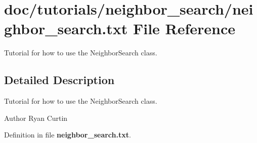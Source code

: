 \section{doc/tutorials/neighbor\-\_\-search/neighbor\-\_\-search.txt File Reference}
\label{neighbor__search_8txt}


Tutorial for how to use the Neighbor\-Search class.  




\subsection{Detailed Description}
Tutorial for how to use the Neighbor\-Search class. \begin{DoxyAuthor}{Author}
Ryan Curtin 
\end{DoxyAuthor}


Definition in file {\bf neighbor\-\_\-search.\-txt}.

